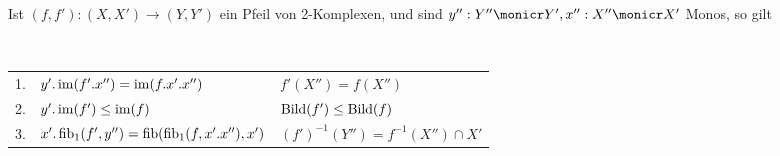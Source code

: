 \begin{lemm}[Regel (n)]
Ist $(f,f') : (X,X') \to (Y,Y')$ ein Pfeil von 2-Komplexen, und sind $y'' : Y'' \monicr Y', x'' : X'' \monicr X'$ Monos, so gilt

\ \linebreak
\begin{tabular}{rll}
   1.
&  $y'.\operatorname{im}(f'.x'') = \operatorname{im}(f.x'.x'')$
&  $f'(X'') = f(X'')$
\\ 2.
&  $y'.\operatorname{im}(f') \leq \operatorname{im}(f)$
&  $\operatorname{Bild}(f') \leq \operatorname{Bild}(f)$
\\ 3.
&  $x'.\operatorname{fib}_1(f',y'') = \operatorname{fib}(\operatorname{fib}_1(f,x'.x''),x')$
&  $(f')^{-1}(Y'') = f^{-1}(X'') \cap X'$
\end{tabular}

\end{lemm}
